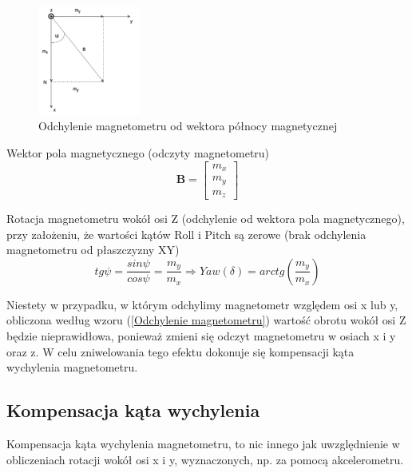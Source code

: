 \begin{figure}[h!]
    \centering
    \includegraphics[width=0.3\textwidth]{Rysunki/Rozdzial03/Magnetometr_odchylenie.png}
    \caption{Odchylenie magnetometru od wektora północy magnetycznej}
    \label{Rotacja magnetometru}
\end{figure}

Wektor pola magnetycznego (odczyty magnetometru)
$$
    \mathbf{B} = 
    \left[
    \begin{array}{c}
        m_x \\
        m_y \\
        m_z
    \end{array}
    \right]
$$

Rotacja magnetometru wokół osi Z (odchylenie od wektora pola magnetycznego), przy założeniu, że wartości kątów Roll i Pitch są zerowe (brak odchylenia magnetometru od płaszczyzny XY)
\begin{equation}
    tg\psi = \frac{sin\psi}{cos\psi} = \frac{m_y}{m_x} \Rightarrow Yaw(\delta) = arctg\left(\frac{m_y}{m_x}\right)
    \label{Odchylenie magnetometru}
\end{equation}

Niestety w przypadku, w którym odchylimy magnetometr względem osi x lub y, obliczona według wzoru (\ref{Odchylenie magnetometru}) wartość obrotu wokół osi Z będzie nieprawidłowa, ponieważ zmieni się odczyt magnetometru w osiach x i y oraz z. W celu zniwelowania tego efektu dokonuje się kompensacji kąta wychylenia magnetometru.

\subsection{Kompensacja kąta wychylenia}
Kompensacja kąta wychylenia magnetometru, to nic innego jak uwzględnienie w obliczeniach rotacji wokół osi x i y, wyznaczonych, np. za pomocą akcelerometru.

